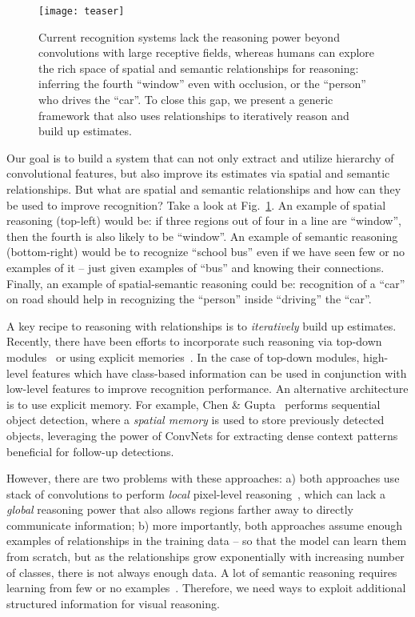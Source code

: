 \documentclass[10pt,twocolumn,letterpaper]{article}
\begin{document}
\begin{figure}[t]
\centering
\texttt{[image: teaser]}
\caption{{\small Current recognition systems lack the reasoning power beyond convolutions with large receptive fields, whereas humans can explore the rich space of spatial and semantic relationships for reasoning: \eg inferring the fourth ``window'' even with occlusion, or the ``person'' who drives the ``car''. To close this gap, we present a generic framework that also uses relationships to iteratively reason and build up estimates.}\label{fig:teaser}}
\vspace{-0.2in}
\end{figure}

Our goal is to build a system that can not only extract and utilize hierarchy of convolutional features, but also improve its estimates via spatial and semantic relationships. But what are spatial and semantic relationships and how can they be used to improve recognition? Take a look at Fig.~\ref{fig:teaser}. An example of spatial reasoning (top-left) would be: if three regions out of four in a line are ``window'', then the fourth is also likely to be ``window''. An example of semantic reasoning (bottom-right) would be to recognize ``school bus'' even if we have seen few or no examples of it -- just given examples of ``bus'' and knowing their connections. Finally, an example of spatial-semantic reasoning could be: recognition of a ``car'' on road should help in recognizing the ``person'' inside ``driving'' the ``car''.

A key recipe to reasoning with relationships is to \emph{iteratively} build up estimates. 
Recently, there have been efforts to incorporate such reasoning via top-down modules~\cite{ronneberger2015u,wei2016convolutional} or using explicit memories~\cite{xiong2016dynamic,marino2016more}. In the case of top-down modules, high-level features which have class-based information can be used in conjunction with low-level features to improve recognition performance. An alternative architecture is to use explicit memory. For example, Chen \& Gupta~\cite{chen2017spatial} performs sequential object detection, where a \emph{spatial memory} is used to store previously detected objects, leveraging the power of ConvNets for extracting dense context patterns beneficial for follow-up detections. 

However, there are two problems with these approaches: a) both approaches use stack of convolutions to perform \emph{local} pixel-level reasoning~\cite{divvala2009empirical}, which can lack a \emph{global} reasoning power that also allows regions farther away to directly communicate information; b) more importantly, both approaches assume enough examples of relationships in the training data -- so that the model can learn them from scratch, but as the relationships grow exponentially with increasing number of classes, there is not always enough data. A lot of semantic reasoning requires learning from few or no examples~\cite{fei2006one}. Therefore, we need ways to exploit additional structured information for visual reasoning.
\end{document}
